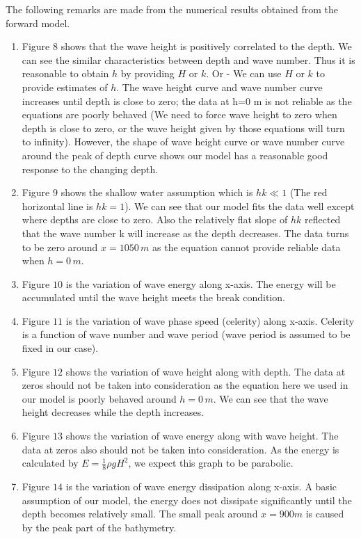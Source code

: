 The following remarks are made from the numerical results obtained from the forward model.
\begin{enumerate}
\item Figure $8$ shows that the wave height is positively correlated to the depth. We can see the similar characteristics between depth and wave number. Thus it is reasonable to obtain $h$ by providing $H$ or $k$.  Or -  We can use $H$ or $k$ to provide estimates of $h$. The wave height curve and wave number curve increases until depth is close to zero; the data at h=0 m is not reliable as the equations are poorly behaved (We need to force wave height to zero when depth is close to zero, or the wave height given by those equations will turn to infinity). However, the shape of wave height curve or wave number curve around the peak of depth curve shows our model has a reasonable good response to the changing depth.

\item Figure $9$ shows the shallow water assumption which is $hk\ll 1$ (The red horizontal line is $hk=1$). We can see that our model fits the data well except where depths are close to zero. Also the relatively flat slope of $hk$ reflected that the wave number k will increase as the depth decreases. The data turns to be zero around $x = 1050 \,m$ as the equation cannot provide reliable data when $h = 0 \,m$.

\item Figure $10$ is the variation of wave energy along x-axis. The energy will be accumulated until the wave height meets the break condition.

\item Figure $11$ is the variation of wave phase speed (celerity) along x-axis. Celerity is a function of wave number and wave period (wave period is assumed to be fixed in our case).

\item Figure $12$ shows the variation of wave height along with depth. The data at zeros should not be taken into consideration as the equation here we used in our model is poorly behaved around $h = 0 \,m$. We can see that the wave height decreases while the depth increases.

\item Figure $13$ shows the variation of wave energy along with wave height. The data at zeros also should not be taken into consideration. As the energy is calculated by $E=\frac{1}{8}\rho g H^2$, we expect this graph to be parabolic.

\item Figure $14$ is the variation of wave energy dissipation along x-axis. A basic assumption of our model, the energy does not dissipate significantly until the depth becomes relatively small. The small peak around $x=900 m$ is caused by the peak part of the bathymetry.
\end{enumerate}